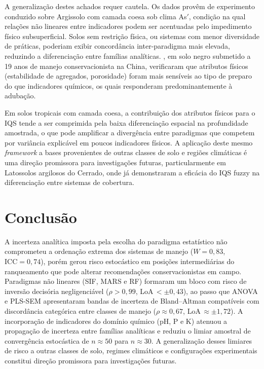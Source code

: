 \documentclass[pdflatex,sn-basic]{sn-jnl}%
\begin{document}
A generalização destes achados requer cautela. Os dados provêm de experimento conduzido sobre Argissolo com camada coesa \cite{LimaNeto2010} sob clima As$'$, condição na qual relações não lineares entre indicadores podem ser acentuadas pelo impedimento físico subsuperficial. Solos sem restrição física, ou sistemas com menor diversidade de práticas, poderiam exibir concordância inter-paradigma mais elevada, reduzindo a diferenciação entre famílias analíticas. \cite{Zhao2022}, em solo negro submetido a 19 anos de manejo conservacionista na China, verificaram que atributos físicos (estabilidade de agregados, porosidade) foram mais sensíveis ao tipo de preparo do que indicadores químicos, os quais responderam predominantemente à adubação. 

Em solos tropicais com camada coesa, a contribuição dos atributos físicos para o IQS tende a ser comprimida pela baixa diferenciação espacial na profundidade amostrada, o que pode amplificar a divergência entre paradigmas que competem por variância explicável em poucos indicadores físicos. A aplicação deste mesmo \textit{framework} a bases provenientes de outras classes de solo e regiões climáticas é uma direção promissora para investigações futuras, particularmente em Latossolos argilosos do Cerrado, onde \cite{DosSantos2021} já demonstraram a eficácia do IQS fuzzy na diferenciação entre sistemas de cobertura.


\section{Conclusão}\label{sec:conclusion}

A incerteza analítica imposta pela escolha do paradigma estatístico não comprometeu a ordenação extrema dos sistemas de manejo ($W = 0{,}83$, $\text{ICC} = 0{,}74$), porém gerou risco estocástico em posições intermediárias do ranqueamento que pode alterar recomendações conservacionistas em campo. Paradigmas não lineares (SIF, MARS e RF) formaram um bloco com risco de inversão decisória negligenciável ($\rho > 0{,}99$, LoA\,$< \pm 0{,}43$), ao passo que ANOVA e PLS-SEM apresentaram bandas de incerteza de Bland--Altman compatíveis com discordância categórica entre classes de manejo ($\rho \approx 0{,}67$, LoA\,$\approx \pm 1{,}72$). A incorporação de indicadores do domínio químico (pH, P e K) atenuou a propagação de incerteza entre famílias analíticas e reduziu o limiar amostral de convergência estocástica de $n \approx 50$ para $n \approx 30$. A generalização desses limiares de risco a outras classes de solo, regimes climáticos e configurações experimentais constitui direção promissora para investigações futuras.
\end{document}
